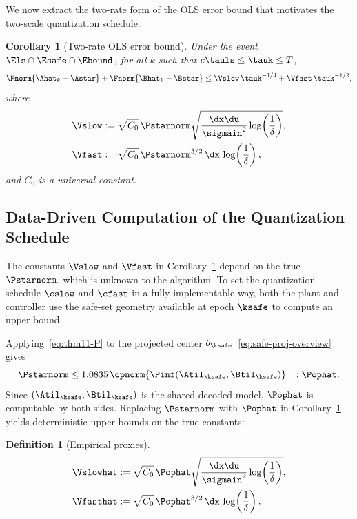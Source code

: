 \documentclass[11pt,journal,onecolumn]{IEEEtran}
\newtheorem{definition}{Definition}
\newtheorem{corollary}{Corollary}
\begin{document}
We now extract the two-rate form of the OLS error bound that motivates the two-scale quantization schedule.

\begin{corollary}[Two-rate OLS error bound]
    \label{cor:ols-two-rate}
    Under the event $\Els \cap \Esafe \cap \Ebound$, for all $k$ such that $c\tauls \le \tauk \le T$,
    \begin{equation}
        \label{eq:ols-two-rate}
        \Fnorm{\Ahat_k - \Astar} + \Fnorm{\Bhat_k - \Bstar} \le \Vslow\,\tauk^{-1/4} + \Vfast\,\tauk^{-1/2},
    \end{equation}
    where
    \begin{align}
        \Vslow &:= \sqrt{C_0}\,\Pstarnorm \sqrt{\frac{\dx\du}{\sigmain^2} \log\!\left(\frac{1}{\delta}\right)}, \label{eq:Vslow-def} \\
        \Vfast &:= \sqrt{C_0}\,\Pstarnorm^{3/2}\,\dx\,\log\!\left(\frac{1}{\delta}\right), \label{eq:Vfast-def}
    \end{align}
    and $C_0$ is a universal constant.
\end{corollary}

\subsection{Data-Driven Computation of the Quantization Schedule}
\label{sec:data-driven}

The constants $\Vslow$ and $\Vfast$ in Corollary~\ref{cor:ols-two-rate} depend on the true $\Pstarnorm$, which is unknown to the algorithm. To set the quantization schedule $\cslow$ and $\cfast$ in a fully implementable way, both the plant and controller use the safe-set geometry available at epoch $\ksafe$ to compute an upper bound.

Applying~\eqref{eq:thm11-P} to the projected center $\tilde\theta_{\ksafe}$~\eqref{eq:safe-proj-overview} gives
\begin{equation}
    \label{eq:Pop-bound}
    \Pstarnorm \le 1.0835\,\opnorm{\Pinf(\Atil_{\ksafe},\Btil_{\ksafe})} =: \Pophat.
\end{equation}
Since $(\Atil_{\ksafe}, \Btil_{\ksafe})$ is the shared decoded model, $\Pophat$ is computable by both sides. Replacing $\Pstarnorm$ with $\Pophat$ in Corollary~\ref{cor:ols-two-rate} yields deterministic upper bounds on the true constants:

\begin{definition}[Empirical proxies]
    \label{def:empirical-proxies}
    \begin{align}
        \Vslowhat &:= \sqrt{C_0}\,\Pophat\sqrt{\frac{\dx\du}{\sigmain^2}\log\!\left(\frac{1}{\delta}\right)}, \label{eq:Vslowhat} \\
        \Vfasthat &:= \sqrt{C_0}\,\Pophat^{3/2}\,\dx\,\log\!\left(\frac{1}{\delta}\right). \label{eq:Vfasthat}
    \end{align}
\end{definition}
\end{document}
